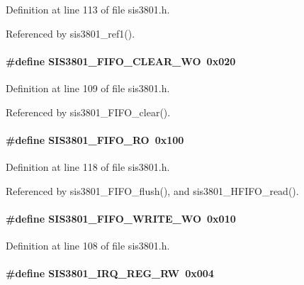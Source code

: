 Definition at line 113 of file sis3801.h.

Referenced by sis3801\_\-ref1().
\paragraph[{SIS3801\_\-FIFO\_\-CLEAR\_\-WO}]{\setlength{\rightskip}{0pt plus 5cm}\#define SIS3801\_\-FIFO\_\-CLEAR\_\-WO~0x020}\hfill\label{sis3801_8h_a0c0fec0eea0557e49416d28f68dc380b}


Definition at line 109 of file sis3801.h.

Referenced by sis3801\_\-FIFO\_\-clear().
\paragraph[{SIS3801\_\-FIFO\_\-RO}]{\setlength{\rightskip}{0pt plus 5cm}\#define SIS3801\_\-FIFO\_\-RO~0x100}\hfill\label{sis3801_8h_a17633afcaa93b027e759d88456f42e1e}


Definition at line 118 of file sis3801.h.

Referenced by sis3801\_\-FIFO\_\-flush(), and sis3801\_\-HFIFO\_\-read().
\paragraph[{SIS3801\_\-FIFO\_\-WRITE\_\-WO}]{\setlength{\rightskip}{0pt plus 5cm}\#define SIS3801\_\-FIFO\_\-WRITE\_\-WO~0x010}\hfill\label{sis3801_8h_aec0d68fc6eda53b92bc90813484483b1}


Definition at line 108 of file sis3801.h.
\paragraph[{SIS3801\_\-IRQ\_\-REG\_\-RW}]{\setlength{\rightskip}{0pt plus 5cm}\#define SIS3801\_\-IRQ\_\-REG\_\-RW~0x004}\hfill\label{sis3801_8h_a7a5e75b5048ded84755f496291794846}


